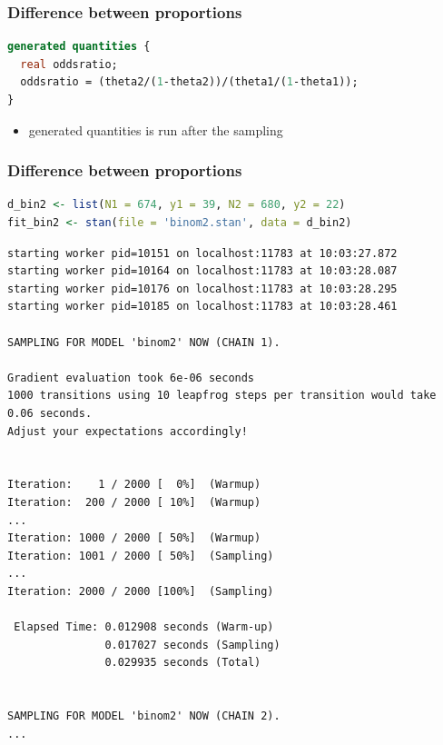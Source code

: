 \documentclass[10pt]{beamer}
\begin{document}
\begin{frame}[fragile]

\frametitle{Difference between proportions}


  {\small
\begin{lstlisting}[language=Stan]
generated quantities {
  real oddsratio;
  oddsratio = (theta2/(1-theta2))/(theta1/(1-theta1));
}
\end{lstlisting}
    }

    \begin{itemize}
    \item generated quantities is run after the sampling
    \end{itemize}

\end{frame}

\begin{frame}[fragile]

\frametitle{Difference between proportions}

  {\small
\begin{lstlisting}[language=R]
d_bin2 <- list(N1 = 674, y1 = 39, N2 = 680, y2 = 22)
fit_bin2 <- stan(file = 'binom2.stan', data = d_bin2)
\end{lstlisting}
  }

  {\tiny
\begin{lstlisting}
starting worker pid=10151 on localhost:11783 at 10:03:27.872
starting worker pid=10164 on localhost:11783 at 10:03:28.087
starting worker pid=10176 on localhost:11783 at 10:03:28.295
starting worker pid=10185 on localhost:11783 at 10:03:28.461

SAMPLING FOR MODEL 'binom2' NOW (CHAIN 1).

Gradient evaluation took 6e-06 seconds
1000 transitions using 10 leapfrog steps per transition would take 0.06 seconds.
Adjust your expectations accordingly!


Iteration:    1 / 2000 [  0%]  (Warmup)
Iteration:  200 / 2000 [ 10%]  (Warmup)
...
Iteration: 1000 / 2000 [ 50%]  (Warmup)
Iteration: 1001 / 2000 [ 50%]  (Sampling)
...
Iteration: 2000 / 2000 [100%]  (Sampling)

 Elapsed Time: 0.012908 seconds (Warm-up)
               0.017027 seconds (Sampling)
               0.029935 seconds (Total)


SAMPLING FOR MODEL 'binom2' NOW (CHAIN 2).
...
\end{lstlisting}
  }

\end{frame}
\end{document}
